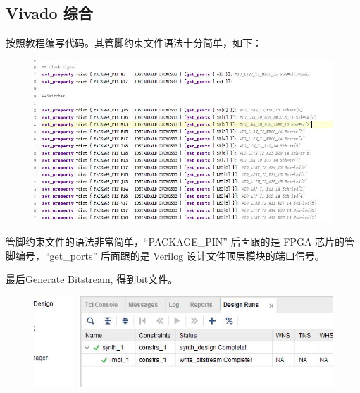 \documentclass[UTF8]{article}
\begin{document}
	\subsection{Vivado 综合}
	按照教程编写代码。其管脚约束文件语法十分简单，如下：\par
	\begin{figure}[H]
		\centering
		\includegraphics[width=1\linewidth]{s5_1.jpg}
		\label{s5_1}
	\end{figure}
	管脚约束文件的语法非常简单，“PACKAGE\_PIN” 后面跟的是 FPGA 芯片的管脚编号，“get\_ports” 后面跟的是 Verilog 设计文件顶层模块的端口信号。\par
	最后Generate Bitstream, 得到bit文件。
	\begin{figure}[H]
		\centering
		\includegraphics[width=1\linewidth]{s5_2.jpg}
		\label{s5_2}
	\end{figure}
	
\end{document}
